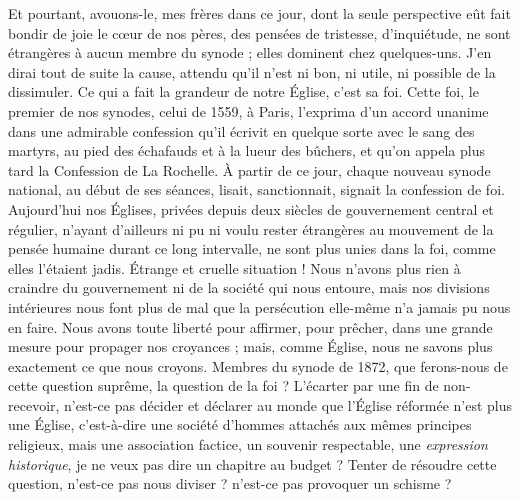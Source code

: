 Et pourtant, avouons-le, mes frères\frcolon{} dans ce jour, dont la seule perspective eût fait bondir de joie le cœur de nos pères, des pensées de tristesse, d’inquiétude, ne sont étrangères à aucun membre du synode ; elles dominent chez quelques-uns. J’en dirai tout de suite la cause, attendu qu’il n’est ni bon, ni utile, ni possible de la dissimuler. Ce qui a fait la grandeur de notre Église, c’est sa foi. Cette foi, le premier de nos synodes, celui de 1559, à Paris, l’exprima d’un accord unanime dans une admirable confession qu’il écrivit en quelque sorte avec le sang des martyrs, au pied des échafauds et à la lueur des bûchers, et qu’on appela plus tard \Og{} la Confession de La Rochelle\Fg{}. À partir de ce jour, chaque nouveau synode national, au début de ses séances, lisait, sanctionnait, signait la confession de foi. Aujourd’hui nos Églises, privées depuis deux siècles de gouvernement central et régulier, n’ayant d’ailleurs ni pu ni voulu rester étrangères au mouvement de la pensée humaine durant ce long intervalle, ne sont plus unies dans la foi, comme elles l’étaient jadis. Étrange et cruelle situation ! Nous n’avons plus rien à craindre du gouvernement ni de la société qui nous entoure, mais nos divisions intérieures nous font plus de mal que la persécution elle-même n’a jamais pu nous en faire. Nous avons toute liberté pour affirmer, pour prêcher, dans une grande mesure pour propager nos croyances ; mais, comme Église, nous ne savons plus exactement ce que nous croyons. Membres du synode de 1872, que ferons-nous de cette question suprême, la question de la foi ? L’écarter par une fin de non-recevoir, n’est-ce pas décider et déclarer au monde que l’Église réformée n’est plus une Église, c’est-à-dire une société d’hommes attachés aux mêmes principes religieux, mais une association factice, un souvenir respectable, une \emph{expression historique}, je ne veux pas dire un chapitre au budget ? Tenter de résoudre cette question, n’est-ce pas nous diviser ? n’est-ce pas provoquer un schisme ?

